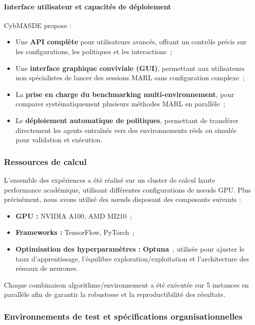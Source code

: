 \paragraph{Interface utilisateur et capacités de déploiement}

CybMASDE propose :
\begin{itemize}
    \item Une \textbf{API complète} pour utilisateurs avancés, offrant un contrôle précis sur les configurations, les politiques et les interactions~;
    \item Une \textbf{interface graphique conviviale (GUI)}, permettant aux utilisateurs non spécialistes de lancer des sessions MARL sans configuration complexe~;
    \item La \textbf{prise en charge du benchmarking multi-environnement}, pour comparer systématiquement plusieurs méthodes MARL en parallèle~;
    \item Le \textbf{déploiement automatique de politiques}, permettant de transférer directement les agents entraînés vers des environnements réels ou simulés pour validation et exécution.
\end{itemize}



\subsubsection{Ressources de calcul}

L'ensemble des expériences a été réalisé sur un cluster de calcul haute performance académique, utilisant différentes configurations de nœuds GPU. Plus précisément, nous avons utilisé des nœuds disposant des composants suivants :
\begin{itemize}
    \item \textbf{GPU :} NVIDIA A100, AMD MI210~;
    \item \textbf{Frameworks :} TensorFlow, PyTorch~;
    \item \textbf{Optimisation des hyperparamètres :} \textbf{Optuna}~\cite{akiba2019optuna}, utilisée pour ajuster le taux d'apprentissage, l'équilibre exploration/exploitation et l'architecture des réseaux de neurones.
\end{itemize}

Chaque combinaison algorithme/environnement a été exécutée sur 5 instances en parallèle afin de garantir la robustesse et la reproductibilité des résultats.

\subsubsection{Environnements de test et spécifications organisationnelles}

